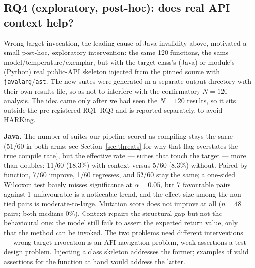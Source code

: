 \subsection{RQ4 (exploratory, post-hoc): does real API context help?}
\label{sec:rq4}
Wrong-target invocation, the leading cause of Java invalidity above, motivated a small
post-hoc, exploratory intervention: the same 120 functions, the same
model/temperature/exemplar, but with the target class's (Java) or module's (Python) real
public-API skeleton injected from the pinned source with \texttt{javalang}/\texttt{ast}.
The new suites were generated in a separate output directory with their own results file,
so as not to interfere with the confirmatory $N=120$ analysis. The idea came only after we
had seen the $N=120$ results, so it sits outside the pre-registered RQ1--RQ3 and is
reported separately, to avoid HARKing.

\textbf{Java.} The number of suites our pipeline scored as compiling stays the same (51/60
in both arms; see Section~\ref{sec:threats} for why that flag overstates the true compile
rate), but the effective rate --- suites that touch the target --- more than doubles:
11/60 (18.3\%) with context versus 5/60 (8.3\%) without. Paired by function, 7/60 improve, 1/60 regresses, and 52/60
stay the same; a one-sided Wilcoxon test barely misses significance at $\alpha=0.05$, but
7 favourable pairs against 1 unfavourable is a noticeable trend, and the effect size among
the non-tied pairs is moderate-to-large. Mutation score does not improve at all ($n=48$
pairs; both medians 0\%). Context repairs the structural gap but not the behavioural one:
the model still fails to assert the expected return value, only that the method can be
invoked. The two problems need different interventions --- wrong-target invocation is an
API-navigation problem, weak assertions a test-design problem. Injecting a class skeleton
addresses the former; examples of valid assertions for the function at hand would address
the latter.

